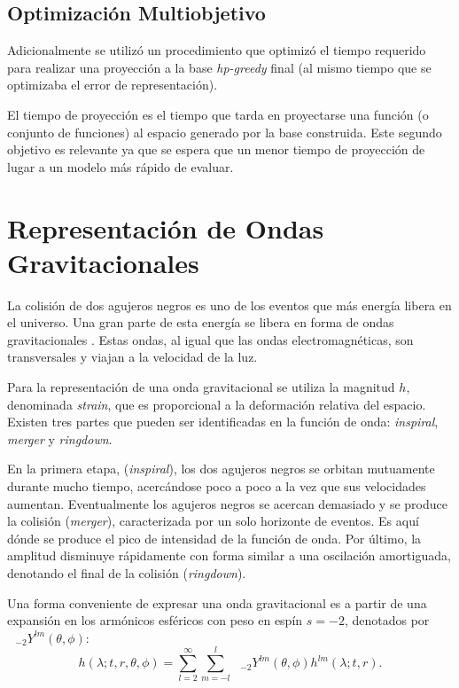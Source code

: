 \subsection*{Optimización Multiobjetivo}

Adicionalmente se utilizó un procedimiento que optimizó el tiempo requerido para realizar una proyección a la base \textit{hp-greedy} final (al mismo tiempo que se optimizaba el error de representación).

El tiempo de proyección es el tiempo que tarda en proyectarse una función (o conjunto de funciones) al espacio generado por la base construida. Este segundo objetivo es relevante ya que se espera que un menor tiempo de proyección de lugar a un modelo más rápido de evaluar.







\section{Representación de Ondas Gravitacionales}

La colisión de dos agujeros negros es uno de los eventos que más energía libera en el universo. Una gran parte de esta energía se libera en forma de ondas gravitacionales \cite{Centrella_2010}. Estas ondas, al igual que las ondas electromagnéticas, son transversales y viajan a la velocidad de la luz.

Para la representación de una onda gravitacional se utiliza la magnitud $h$, denominada \textit{strain}, que es proporcional a la deformación relativa del espacio. Existen tres partes que pueden ser identificadas en la función de onda: \textit{inspiral}, \textit{merger} y \textit{ringdown}. 

En la primera etapa, (\textit{inspiral}), los dos agujeros negros se orbitan mutuamente durante mucho tiempo, acercándose poco a poco a la vez que sus velocidades aumentan. Eventualmente los agujeros negros se acercan demasiado y se produce la colisión (\textit{merger}), caracterizada por un solo horizonte de eventos. Es aquí dónde se produce el pico de intensidad de la función de onda. Por último, la amplitud disminuye rápidamente con forma similar a una oscilación amortiguada, denotando el final de la colisión (\textit{ringdown}).

Una forma conveniente de expresar una onda gravitacional es a partir de una expansión en los armónicos esféricos con peso en espín $s=-2$, denotados por $\text{ }_{-2} Y^{lm} (\theta, \phi)$:
\begin{equation}
h( \lambda; t, r, \theta , \phi) =  \sum_{l=2}^{\infty}  \sum_{m=-l}^{l} \text{ }_{-2} Y^{lm} (\theta, \phi) h^{lm}(\lambda; t, r).
\end{equation}


